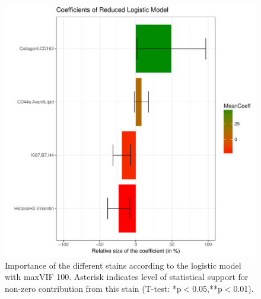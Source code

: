 \documentclass[a4paper]{article}\usepackage[]{graphicx}\usepackage[]{color}
\makeatletter
\def\maxwidth{ %
  \ifdim\Gin@nat@width>\linewidth
    \linewidth
  \else
    \Gin@nat@width
  \fi
}
\newenvironment{kframe}{%
 \def\at@end@of@kframe{}%
 \ifinner\ifhmode%
  \def\at@end@of@kframe{\end{minipage}}%
  \begin{minipage}{\columnwidth}%
 \fi\fi%
 \def\FrameCommand##1{\hskip\@totalleftmargin \hskip-\fboxsep
 \colorbox{shadecolor}{##1}\hskip-\fboxsep
     \hskip-\linewidth \hskip-\@totalleftmargin \hskip\columnwidth}%
 \MakeFramed {\advance\hsize-\width
   \@totalleftmargin\z@ \linewidth\hsize
   \@setminipage}}%
 {\par\unskip\endMakeFramed%
 \at@end@of@kframe}
\newenvironment{knitrout}{}{} %
\makeatother
\begin{document}
\begin{knitrout}
\begin{kframe}
{\ttfamily\noindent\color{warningcolor}{\#\# Warning: Removed 1 rows containing missing values (geom\_text).}}\end{kframe}\begin{figure}[h]
\includegraphics[width=\maxwidth]{figure/Fig_Model4Coef-1} \caption[Importance of the different stains according to the logistic model with maxVIF 100]{Importance of the different stains according to the logistic model with maxVIF 100. Asterisk indicates level of statistical support for non-zero contribution from this stain (T-test: *p$<$0.05,**p$<$0.01).}\label{fig:Fig_Model4Coef}
\end{figure}


\end{knitrout}
\end{document}
